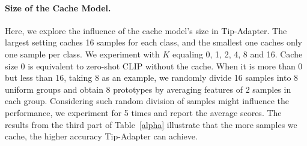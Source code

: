 \documentclass[10pt,twocolumn,letterpaper]{article}
\begin{document}
    

\paragraph{Size of the Cache Model.}
\label{size}
Here, we explore the influence of the cache model's size in Tip-Adapter. The largest setting caches 16 samples for each class, and the smallest one caches only one sample per class. We experiment with $K$ equaling 0, 1, 2, 4, 8 and 16. Cache size 0 is equivalent to zero-shot CLIP without the cache. When it is more than 0 but less than 16, taking 8 as an example, we randomly divide 16 samples into 8 uniform groups and obtain 8 prototypes by averaging features of 2 samples in each group. Considering such random division of samples might influence the performance, we experiment for 5 times and report the average scores.
The results from the third part of Table~\ref{alpha} illustrate that the more samples we cache, the higher accuracy Tip-Adapter can achieve.
\end{document}
